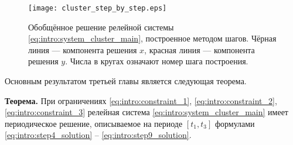\begin{figure}[!ht]
	\centering
	\texttt{[image: cluster\_step\_by\_step.eps]}
	\caption{Обобщённое решение релейной системы \eqref{eq:intro:system_cluster_main}, построенное методом шагов. Чёрная линия --- компонента решения $x$, красная линия --- компонента решения $y$. Числа в кругах означают номер шага построения.}
	\label{fig:intro:cluster_step_by_step}
\end{figure}

Основным результатом третьей главы является следующая теорема.

\textbf{Теорема.} При ограничениях \eqref{eq:intro:constraint_1}, \eqref{eq:intro:constraint_2}, \eqref{eq:intro:constraint_3} релейная система \eqref{eq:intro:system_cluster_main} имеет периодическое решение, описываемое на периоде $[t_1, t_3]$ формулами \eqref{eq:intro:step4_solution} -- \eqref{eq:intro:step9_solution}.



